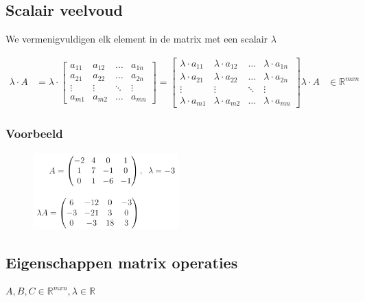 \documentclass{article}
\begin{document}
\subsection{Scalair veelvoud}

We vermenigvuldigen elk element in de matrix met een scalair $\lambda$

\begin{align*}
\lambda \cdot A & = \lambda \cdot 
\begin{bmatrix}
    a_{11} & a_{12} & \dots & a_{1n}\\
    a_{21} & a_{22} & \dots & a_{2n}\\
    \vdots & \vdots & \ddots & \vdots\\
    a_{m1} & a_{m2} & \dots & a_{mn}
\end{bmatrix} =
\begin{bmatrix}
    \lambda\cdot a_{11} & \lambda\cdot a_{12} & \dots & \lambda\cdot a_{1n}\\
    \lambda\cdot a_{21} & \lambda\cdot a_{22} & \dots & \lambda\cdot a_{2n}\\
    \vdots & \vdots & \ddots & \vdots\\
    \lambda\cdot a_{m1} & \lambda\cdot a_{m2} & \dots & \lambda\cdot a_{mn}
\end{bmatrix}
\lambda \cdot A & \in \mathbb{R}^{mxn}
\end{align*}

\subsubsection{Voorbeeld}

\begin{figure}[H]
    \centering
    \includegraphics[width=0.5\textwidth]{matrix-scalair-voorbeeld.png}
\end{figure}


\subsection{Eigenschappen matrix operaties}

$A, B, C \in \mathbb{R}^{mxn}, \lambda \in \mathbb{R}$
\end{document}
